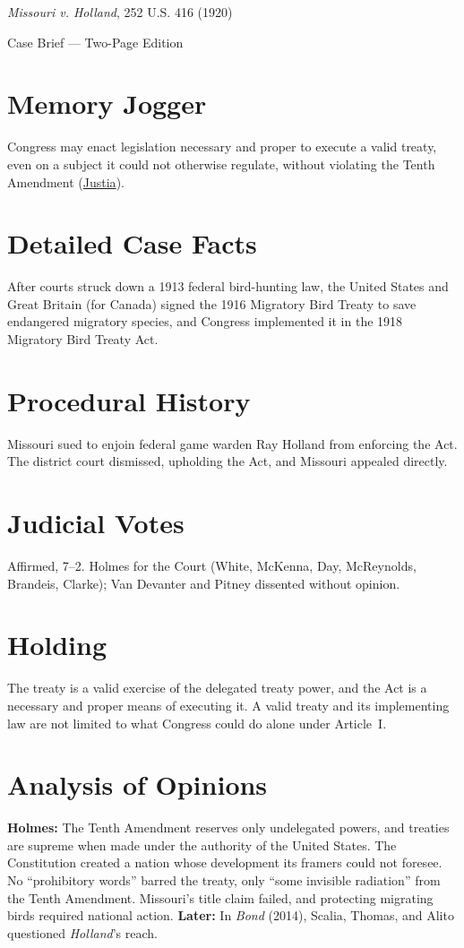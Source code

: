 \documentclass[12pt]{article}
\begin{document}
\begin{center}
{\LARGE \textit{Missouri v. Holland}, 252 U.S. 416 (1920)\par}
\vspace{0.5em}
{\large Case Brief --- Two-Page Edition\par}
\end{center}

\section{Memory Jogger}
Congress may enact legislation necessary and proper to execute a valid treaty, even on a subject it could not otherwise regulate, without violating the Tenth Amendment (\href{https://supreme.justia.com/cases/federal/us/252/416/}{Justia}).

\section{Detailed Case Facts}
After courts struck down a 1913 federal bird-hunting law, the United States and Great Britain (for Canada) signed the 1916 Migratory Bird Treaty to save endangered migratory species, and Congress implemented it in the 1918 Migratory Bird Treaty Act.

\section{Procedural History}
Missouri sued to enjoin federal game warden Ray Holland from enforcing the Act. The district court dismissed, upholding the Act, and Missouri appealed directly.

\section{Judicial Votes}
Affirmed, 7--2. Holmes for the Court (White, McKenna, Day, McReynolds, Brandeis, Clarke); Van Devanter and Pitney dissented without opinion.

\section{Holding}
The treaty is a valid exercise of the delegated treaty power, and the Act is a necessary and proper means of executing it. A valid treaty and its implementing law are not limited to what Congress could do alone under Article~I.

\section{Analysis of Opinions}
\textbf{Holmes:} The Tenth Amendment reserves only undelegated powers, and treaties are supreme when made under the authority of the United States. The Constitution created a nation whose development its framers could not foresee. No ``prohibitory words'' barred the treaty, only ``some invisible radiation'' from the Tenth Amendment. Missouri's title claim failed, and protecting migrating birds required national action. \textbf{Later:} In \textit{Bond} (2014), Scalia, Thomas, and Alito questioned \textit{Holland}'s reach.
\end{document}
